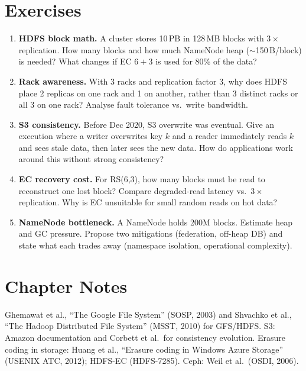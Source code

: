\section{Exercises}
\label{sec:ch06-exercises}
\begin{enumerate}[label=E6.\arabic*, leftmargin=*, itemsep=0.6em]
    \item \textbf{HDFS block math.} A cluster stores 10\,PB in 128\,MB blocks with $3\times$ replication. How many blocks and how much NameNode heap ($\sim$150\,B/block) is needed? What changes if EC $6+3$ is used for 80\% of the data?
    \item \textbf{Rack awareness.} With 3 racks and replication factor 3, why does HDFS place 2 replicas on one rack and 1 on another, rather than 3 distinct racks or all 3 on one rack? Analyse fault tolerance vs.\ write bandwidth.
    \item \textbf{S3 consistency.} Before Dec 2020, S3 overwrite was eventual. Give an execution where a writer overwrites key $k$ and a reader immediately reads $k$ and sees stale data, then later sees the new data. How do applications work around this without strong consistency?
    \item \textbf{EC recovery cost.} For RS(6,3), how many blocks must be read to reconstruct one lost block? Compare degraded-read latency vs.\ $3\times$ replication. Why is EC unsuitable for small random reads on hot data?
    \item \textbf{NameNode bottleneck.} A NameNode holds 200M blocks. Estimate heap and GC pressure. Propose two mitigations (federation, off-heap DB) and state what each trades away (namespace isolation, operational complexity).
\end{enumerate}

\section*{Chapter Notes}
Ghemawat et al., ``The Google File System'' (SOSP, 2003) and Shvachko et al., ``The Hadoop Distributed File System'' (MSST, 2010) for GFS/HDFS. S3: Amazon documentation and Corbett et al.\ for consistency evolution. Erasure coding in storage: Huang et al., ``Erasure coding in Windows Azure Storage'' (USENIX ATC, 2012); HDFS-EC (HDFS-7285). Ceph: Weil et al.\ (OSDI, 2006).

